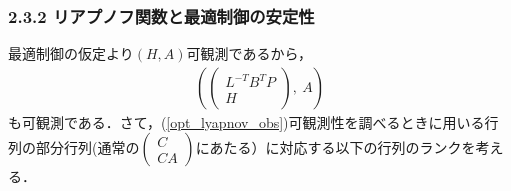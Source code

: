 \begin{frame}[t]
\frametitle{2.3.2 リアプノフ関数と最適制御の安定性}

最適制御の仮定より$(H,A)$可観測であるから，
\begin{align}
	\left( \left(\begin{array}{c} L^{-T} B^T P \\ H \end{array}\right), \ A \right)
\label{opt_lyapnov_obs2}
\end{align}
も可観測である．さて，(\ref{opt_lyapnov_obs})可観測性を調べるときに用いる行列の部分行列(通常の$\left(\begin{array}{c} C \\CA \end{array}\right)$にあたる）に対応する以下の行列のランクを考える．
\end{frame}


